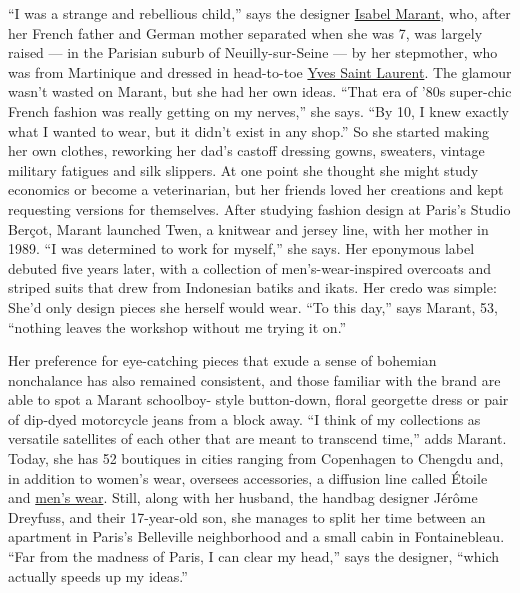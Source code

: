 ``I was a strange and rebellious child,'' says the designer
\href{https://www.nytimes3xbfgragh.onion/slideshow/2019/03/02/t-magazine/48-hours-with-isabel-marant-in-paris.html}{Isabel
Marant}, who, after her French father and German mother separated when
she was 7, was largely raised --- in the Parisian suburb of
Neuilly-sur-Seine --- by her stepmother, who was from Martinique and
dressed in head-to-toe
\href{https://www.nytimes3xbfgragh.onion/topic/person/yves-saint-laurent}{Yves
Saint Laurent}. The glamour wasn't wasted on Marant, but she had her own
ideas. ``That era of '80s super-chic French fashion was really getting
on my nerves,'' she says. ``By 10, I knew exactly what I wanted to wear,
but it didn't exist in any shop.'' So she started making her own
clothes, reworking her dad's castoff dressing gowns, sweaters, vintage
military fatigues and silk slippers. At one point she thought she might
study economics or become a veterinarian, but her friends loved her
creations and kept requesting versions for themselves. After studying
fashion design at Paris's Studio Berçot, Marant launched Twen, a
knitwear and jersey line, with her mother in 1989. ``I was determined to
work for myself,'' she says. Her eponymous label debuted five years
later, with a collection of men's-wear-inspired overcoats and striped
suits that drew from Indonesian batiks and ikats. Her credo was simple:
She'd only design pieces she herself would wear. ``To this day,'' says
Marant, 53, ``nothing leaves the workshop without me trying it on.''

Her preference for eye-catching pieces that exude a sense of bohemian
nonchalance has also remained consistent, and those familiar with the
brand are able to spot a Marant schoolboy- style button-down, floral
georgette dress or pair of dip-dyed motorcycle jeans from a block away.
``I think of my collections as versatile satellites of each other that
are meant to transcend time,'' adds Marant. Today, she has 52 boutiques
in cities ranging from Copenhagen to Chengdu and, in addition to women's
wear, oversees accessories, a diffusion line called Étoile and
\href{https://www.nytimes3xbfgragh.onion/2017/09/29/fashion/isabel-marant-menswear-paris-fashion-week.html}{men's
wear}. Still, along with her husband, the handbag designer Jérôme
Dreyfuss, and their 17-year-old son, she manages to split her time
between an apartment in Paris's Belleville neighborhood and a small
cabin in Fontainebleau. ``Far from the madness of Paris, I can clear my
head,'' says the designer, ``which actually speeds up my ideas.''

